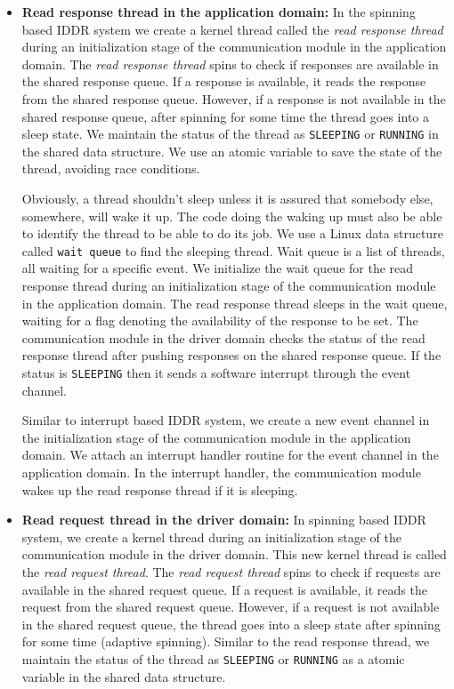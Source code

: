\begin{itemize}
\item \textbf{Read response thread in the application domain:} 
In the spinning based IDDR system we create a kernel thread called the \textit{read
response thread} during an initialization stage of the communication
module in the application domain. The \textit{read response thread} spins
to check if responses are available in the shared response queue. If a
response is available, it reads the response from the shared response
queue. However, if a response is not available in the shared response
queue, after spinning for some time the thread goes into a sleep state. We
maintain the status of the thread as \texttt{SLEEPING} or \texttt{RUNNING}
in the shared data structure. We use an atomic variable to save the
state of the thread, avoiding race conditions.

Obviously, a thread shouldn't sleep unless it is assured that somebody else, somewhere, will wake it up. The code doing the waking up must also be able to identify the thread to be able to do its job. We use a Linux data structure called \texttt{wait queue} to find the sleeping thread. Wait queue is a list of threads, all waiting for a specific event\cite{Galvin, Bovet:2005:ULK:1077084}. We initialize the wait queue for the read response thread during an initialization stage of the communication module in the application domain. The read response thread sleeps in the wait queue, waiting for a flag denoting the availability of the response to be set. The communication module in the driver domain checks the status of the read response thread after pushing responses on the shared response queue. If the status is \texttt{SLEEPING} then it sends a software interrupt through the event channel.

Similar to interrupt based IDDR system, we create a new event channel in
the initialization stage of the communication module in the application
domain. We attach an interrupt handler routine for the event channel
in the application domain. In the interrupt handler, the communication
module wakes up the read response thread if it is sleeping.

\item \textbf{Read request thread in the driver domain:}
In spinning based IDDR system, we create a kernel thread during
an initialization stage of the communication module in the driver
domain. This new kernel thread is called the \textit{read request
thread}. The \textit{read request thread} spins to check if requests are
available in the shared request queue. If a request is available, it reads
the request from the shared request queue. However, if a request is not
available in the shared request queue, the thread goes into a sleep state
after spinning for some time (adaptive spinning). Similar to the read
response thread, we maintain the status of the thread as \texttt{SLEEPING}
or \texttt{RUNNING} as a atomic variable in the shared data structure.


\end{itemize}
